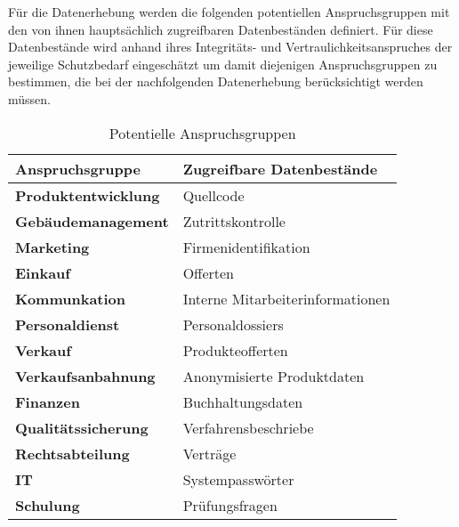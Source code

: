 \begin{sloppypar}
Für die Datenerhebung werden die folgenden potentiellen Anspruchsgruppen mit den von ihnen hauptsächlich zugreifbaren Datenbeständen definiert. Für diese Datenbestände wird anhand ihres Integritäts- und Vertraulichkeitsanspruches der jeweilige Schutzbedarf eingeschätzt um damit diejenigen Anspruchsgruppen zu bestimmen, die bei der nachfolgenden Datenerhebung berücksichtigt werden müssen.
\end{sloppypar}


\begin{table}[H]
\centering
\caption{Potentielle Anspruchsgruppen}
\label{potentielle_anspruchsgruppen}


\begin{tabular}{ |l|l| }


\hline
\rowcolor[HTML]{C0C0C0} 
\textbf{Anspruchsgruppe} & \textbf{Zugreifbare Datenbestände}\\ 
\hline


\textbf{Produktentwicklung} & Quellcode                     \\ \hline
\textbf{Gebäudemanagement} & Zutrittskontrolle              \\ \hline
\textbf{Marketing} & Firmenidentifikation                   \\ \hline
\textbf{Einkauf} & Offerten                                 \\ \hline
\textbf{Kommunkation} & Interne Mitarbeiterinformationen    \\ \hline
\textbf{Personaldienst} & Personaldossiers                  \\ \hline
\textbf{Verkauf} & Produkteofferten                         \\ \hline
\textbf{Verkaufsanbahnung} & Anonymisierte Produktdaten     \\ \hline
\textbf{Finanzen} & Buchhaltungsdaten                       \\ \hline
\textbf{Qualitätssicherung} & Verfahrensbeschriebe          \\ \hline
\textbf{Rechtsabteilung} & Verträge                         \\ \hline
\textbf{IT} &  Systempasswörter                             \\ \hline
\textbf{Schulung} & Prüfungsfragen                          \\ \hline

\end{tabular}
\end{table}

